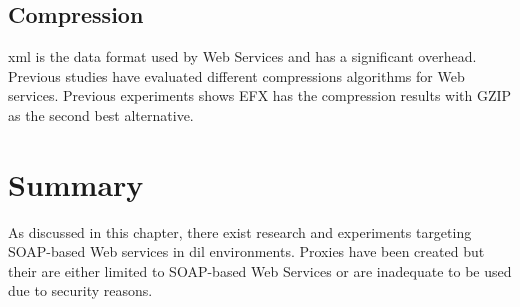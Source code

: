 \subsection{Compression}

\gls{xml} is the data format used by Web Services and has a significant
overhead. Previous studies have evaluated different compressions algorithms for
Web services. Previous experiments shows EFX has the compression results with
GZIP as the second best alternative\cite{johnsen-trude-compression-techniqes}.


\section{Summary}

As discussed in this chapter, there exist research and experiments targeting
SOAP-based Web services in \gls{dil} environments. Proxies have been created but
their are either limited to SOAP-based Web Services or are inadequate to be used
due to security reasons.
